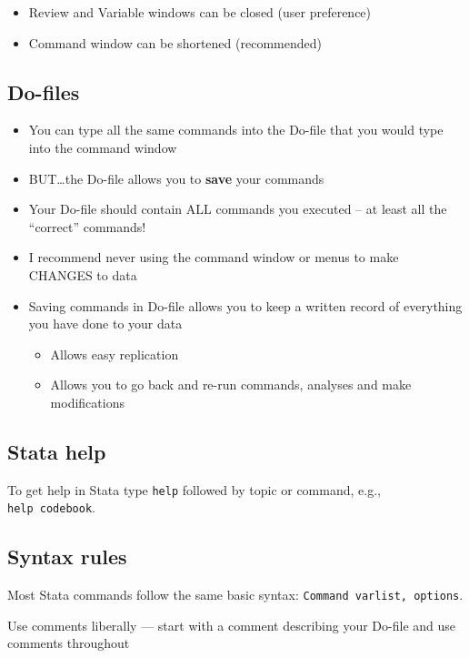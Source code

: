 \documentclass[]{book}
\providecommand{\tightlist}{%
  \setlength{\itemsep}{0pt}\setlength{\parskip}{0pt}}
\begin{document}
\begin{itemize}
\tightlist
\item
  Review and Variable windows can be closed (user preference)
\item
  Command window can be shortened (recommended)
\end{itemize}

\subsection{Do-files}\label{do-files}

\begin{itemize}
\tightlist
\item
  You can type all the same commands into the Do-file that you would
  type into the command window
\item
  BUT\ldots{}the Do-file allows you to \textbf{save} your commands
\item
  Your Do-file should contain ALL commands you executed -- at least all
  the ``correct'' commands!
\item
  I recommend never using the command window or menus to make CHANGES to
  data
\item
  Saving commands in Do-file allows you to keep a written record of
  everything you have done to your data

  \begin{itemize}
  \tightlist
  \item
    Allows easy replication
  \item
    Allows you to go back and re-run commands, analyses and make
    modifications
  \end{itemize}
\end{itemize}

\subsection{Stata help}\label{stata-help}

To get help in Stata type \texttt{help} followed by topic or command,
e.g., \texttt{help\ codebook}.

\subsection{Syntax rules}\label{syntax-rules-1}

Most Stata commands follow the same basic syntax:
\texttt{Command\ varlist,\ options}.

Use comments liberally --- start with a comment describing your Do-file
and use comments throughout
\end{document}
